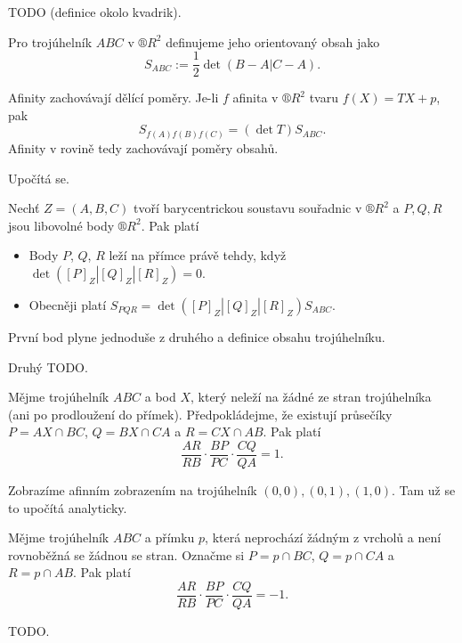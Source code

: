 \documentclass[12pt]{article}					%
\begin{document}
TODO (definice okolo kvadrik).


\begin{definice}
	Pro trojúhelník $ABC$ v $®R^2$ definujeme jeho orientovaný obsah jako
	$$ S_{ABC} := \frac{1}{2} \det(B - A | C - A). $$
\end{definice}

\begin{veta}
	Afinity zachovávají dělící poměry. Je-li $f$ afinita v $®R^2$ tvaru $f(X) = T X + p$, pak
	$$ S_{f(A)f(B)f(C)} = (\det T)S_{ABC}. $$
	Afinity v rovině tedy zachovávají poměry obsahů.

	\begin{dukazin}
		Upočítá se.
	\end{dukazin}
\end{veta}

\begin{veta}
	Nechť $Z = (A, B, C)$ tvoří barycentrickou soustavu souřadnic v $®R^2$ a $P, Q, R$ jsou libovolné body $®R^2$. Pak platí

	\begin{itemize}
		\item Body $P$, $Q$, $R$ leží na přímce právě tehdy, když $\det([P]_Z | [Q]_Z | [R]_Z) = 0$.
		\item Obecněji platí $S_{PQR} = \det([P]_Z | [Q]_Z | [R]_Z) S_{ABC}$.
	\end{itemize}

	\begin{dukazin}
		První bod plyne jednoduše z druhého a definice obsahu trojúhelníku.

		Druhý TODO.
	\end{dukazin}
\end{veta}

\begin{veta}[Cevova]
	Mějme trojúhelník $ABC$ a bod $X$, který neleží na žádné ze stran trojúhelníka (ani po prodloužení do přímek). Předpokládejme, že existují průsečíky $P = AX \cap BC$, $Q = BX \cap CA$ a $R = CX \cap AB$. Pak platí
	$$ \frac{AR}{RB}·\frac{BP}{PC}·\frac{CQ}{QA} = 1. $$

	\begin{dukazin}
		Zobrazíme afinním zobrazením na trojúhelník $(0, 0), (0, 1), (1, 0)$. Tam už se to upočítá analyticky.
	\end{dukazin}
\end{veta}

\begin{veta}[Menelaova]
	Mějme trojúhelník $ABC$ a přímku $p$, která neprochází žádným z vrcholů a není rovnoběžná se žádnou se stran. Označme si $P = p \cap BC$, $Q = p \cap CA$ a $R = p \cap AB$. Pak platí 
	$$ \frac{AR}{RB}·\frac{BP}{PC}·\frac{CQ}{QA} = -1. $$

	\begin{dukazin}
		TODO.
	\end{dukazin}
\end{veta}
\end{document}

